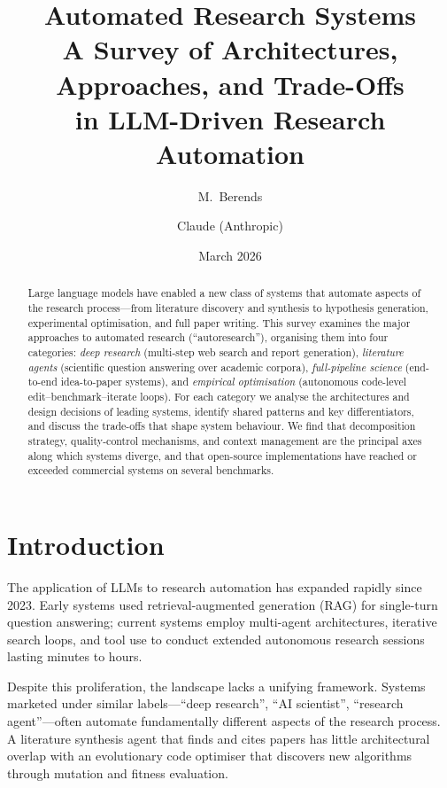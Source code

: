 \documentclass[11pt,a4paper]{article}
\title{\textbf{Automated Research Systems}\\[0.3em]
  \large A Survey of Architectures, Approaches, and Trade-Offs\\
  in LLM-Driven Research Automation}
\author{M.\ Berends \and Claude (Anthropic)}
\date{March 2026}
\begin{document}
\maketitle

\begin{abstract}
Large language models have enabled a new class of systems that automate
aspects of the research process---from literature discovery and synthesis
to hypothesis generation, experimental optimisation, and full paper
writing. This survey examines the major approaches to automated research
(``autoresearch''), organising them into four categories: \emph{deep
research} (multi-step web search and report generation), \emph{literature
agents} (scientific question answering over academic corpora),
\emph{full-pipeline science} (end-to-end idea-to-paper systems), and
\emph{empirical optimisation} (autonomous code-level
edit--benchmark--iterate loops). For each category we analyse the
architectures and design decisions of leading systems, identify shared
patterns and key differentiators, and discuss the trade-offs that shape
system behaviour. We find that decomposition strategy, quality-control
mechanisms, and context management are the principal axes along which
systems diverge, and that open-source implementations have reached or
exceeded commercial systems on several benchmarks.
\end{abstract}

\section{Introduction}
\label{sec:intro}

The application of LLMs to research automation has expanded rapidly
since 2023. Early systems used retrieval-augmented generation (RAG) for
single-turn question answering; current systems employ multi-agent
architectures, iterative search loops, and tool use to conduct extended
autonomous research sessions lasting minutes to hours.

Despite this proliferation, the landscape lacks a unifying framework.
Systems marketed under similar labels---``deep research'',
``AI scientist'', ``research agent''---often automate fundamentally
different aspects of the research process. A literature synthesis agent
that finds and cites papers has little architectural overlap with an
evolutionary code optimiser that discovers new algorithms through
mutation and fitness evaluation.
\end{document}
